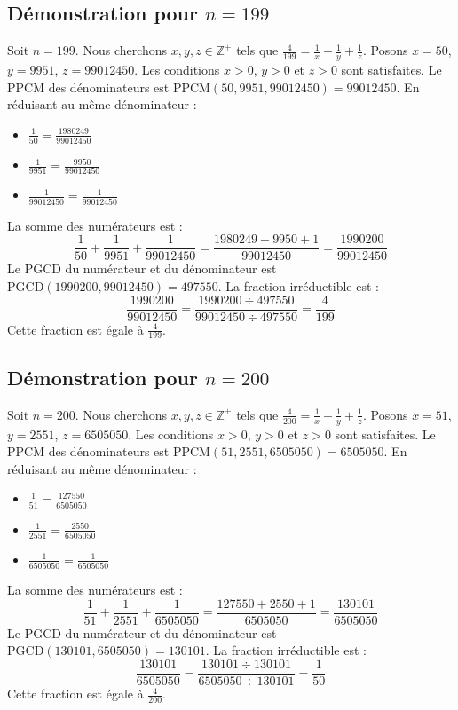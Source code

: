 \documentclass[11pt,a4paper]{article}
\begin{document}
\subsection{Démonstration pour $n = 199$}
Soit $n = 199$. Nous cherchons $x, y, z \in \mathbb{Z}^{+}$ tels que $\frac{4}{199} = \frac{1}{x} + \frac{1}{y} + \frac{1}{z}$.
Posons $x = 50$, $y = 9951$, $z = 99012450$.
Les conditions $x > 0$, $y > 0$ et $z > 0$ sont satisfaites.
Le PPCM des dénominateurs est $\text{PPCM}(50, 9951, 99012450) = 99012450$.
En réduisant au même dénominateur :
\begin{itemize}
    \item $\frac{1}{50} = \frac{1980249}{99012450}$
    \item $\frac{1}{9951} = \frac{9950}{99012450}$
    \item $\frac{1}{99012450} = \frac{1}{99012450}$
\end{itemize}
La somme des numérateurs est :
$$ \frac{1}{50} + \frac{1}{9951} + \frac{1}{99012450} = \frac{1980249 + 9950 + 1}{99012450} = \frac{1990200}{99012450} $$
Le PGCD du numérateur et du dénominateur est $\text{PGCD}(1990200, 99012450) = 497550$.
La fraction irréductible est :
$$ \frac{1990200}{99012450} = \frac{1990200 \div 497550}{99012450 \div 497550} = \frac{4}{199} $$
Cette fraction est égale à $\frac{4}{199}$.

\subsection{Démonstration pour $n = 200$}
Soit $n = 200$. Nous cherchons $x, y, z \in \mathbb{Z}^{+}$ tels que $\frac{4}{200} = \frac{1}{x} + \frac{1}{y} + \frac{1}{z}$.
Posons $x = 51$, $y = 2551$, $z = 6505050$.
Les conditions $x > 0$, $y > 0$ et $z > 0$ sont satisfaites.
Le PPCM des dénominateurs est $\text{PPCM}(51, 2551, 6505050) = 6505050$.
En réduisant au même dénominateur :
\begin{itemize}
    \item $\frac{1}{51} = \frac{127550}{6505050}$
    \item $\frac{1}{2551} = \frac{2550}{6505050}$
    \item $\frac{1}{6505050} = \frac{1}{6505050}$
\end{itemize}
La somme des numérateurs est :
$$ \frac{1}{51} + \frac{1}{2551} + \frac{1}{6505050} = \frac{127550 + 2550 + 1}{6505050} = \frac{130101}{6505050} $$
Le PGCD du numérateur et du dénominateur est $\text{PGCD}(130101, 6505050) = 130101$.
La fraction irréductible est :
$$ \frac{130101}{6505050} = \frac{130101 \div 130101}{6505050 \div 130101} = \frac{1}{50} $$
Cette fraction est égale à $\frac{4}{200}$.
\end{document}
